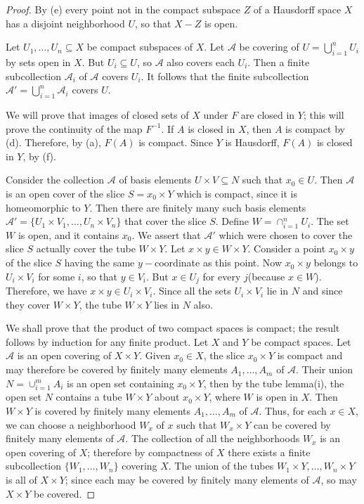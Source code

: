 \documentclass[11pt,a4paper]{article}
\begin{document}
\begin{proof}
 By (e) every point not in the compact subspace $Z$ of a Hausdorff space $X$ has a disjoint neighborhood $U$, so that $X-Z$ is open.

 Let $U_1,\ldots,U_n\subseteq X$ be compact subspaces of $X$. Let $\mathcal{A}$ be covering of $U = \bigcup_{i=1}^n U_i$ by sets open in $X$. But $U_i\subseteq U$, so $\mathcal{A}$ also covers each $U_i$. Then a finite subcollection $\mathcal{A}_i$ of $\mathcal{A}$ covers $U_i$. It follows that the finite subcollection $\mathcal{A}' = \bigcup_{i=1}^n \mathcal{A}_i$ covers $U$.

 We will prove that images of closed sets of $X$ under $F$ are closed in $Y$; this will prove the continuity of the map $F^{-1}$. If $A$ is closed in $X$, then $A$ is compact by (d). Therefore, by (a), $F(A)$ is compact. Since $Y$ is Hausdorff, $F(A)$ is closed in $Y$, by (f).

 Consider the collection $\mathcal{A}$ of basis elements $U\times V\subseteq N$ such that $x_0\in U$. Then $\mathcal{A}$ is an open cover of the slice $S = x_0\times Y$ which is compact, since it is homeomorphic to $Y$. Then there are finitely many such basis elements $\mathcal{A}' = \{U_1\times V_1,\ldots,U_n\times V_n\}$ that cover the slice $S$. Define $W = \cap_{i=1}^n U_i$. The set $W$ is open, and it contains $x_0$. We assert that $\mathcal{A}'$ which were chosen to cover the slice $S$ actually cover the tube $W\times Y$. Let $x\times y\in W\times Y$. Consider a point $x_0\times y$ of the slice $S$ having the same $y-$coordinate as this point. Now $x_0\times y$ belongs to $U_i\times V_i$ for some $i$, so that $y\in V_i$. But $x\in U_j$ for every $j$(because $x\in W$). Therefore, we have $x\times y\in U_i\times V_i$. Since all the sets $U_i\times V_i$ lie in $N$ and since they cover $W\times Y$, the tube $W\times Y$ lies in $N$ also. 

 We shall prove that the product of two compact spaces is compact; the result follows by induction for any finite product. Let $X$ and $Y$ be compact spaces. Let $\mathcal{A}$ is an open covering of $X\times Y$. Given $x_0\in X$, the slice $x_0\times Y$ is compact and may therefore be covered by finitely many elements $A_1,\ldots,A_m$ of $\mathcal{A}$. Their union $N = \cup_{i=1}^m A_i$ is an open set containing $x_0\times Y$, then by the tube lemma(i), the open set $N$ contains a tube $W\times Y$ about $x_0\times Y$, where $W$ is open in $X$. Then $W\times Y$ is covered by finitely many elements $A_1,\ldots,A_m$ of $\mathcal{A}$. Thus, for each $x\in X$, we can choose a neighborhood $W_x$ of $x$ such that $W_x\times Y$ can be covered by finitely many elements of $\mathcal{A}$. The collection of all the neighborhoods $W_x$ is an open covering of $X$; therefore by compactness of $X$ there exists a finite subcollection $\{W_1,\ldots,W_n\}$ covering $X$. The union of the tubes $W_1\times Y,\ldots, W_n\times Y$ is all of $X\times Y$; since each may be covered by finitely many elements of $\mathcal{A}$, so may $X\times Y$ be covered.


\end{proof}
\end{document}
